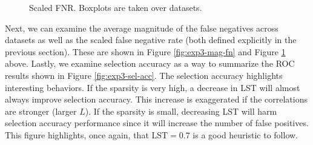 \documentclass[11pt]{article}
\begin{document}
\begin{figure}[H]
	\centering
	\caption{Scaled FNR. Boxplots are taken over datasets.}
	\label{fig:exp3-mag-fn-scaled}
\end{figure}

Next, we can examine the average magnitude of the false negatives across datasets as well as the scaled false negative rate (both defined explicitly in the previous section). These are shown in Figure \ref{fig:exp3-mag-fn} and Figure \ref{fig:exp3-mag-fn-scaled} above.  Lastly, we examine selection accuracy as a way to summarize the ROC results shown in Figure \ref{fig:exp3-sel-acc}. The selection accuracy highlights interesting behaviors. If the sparsity is very high, a decrease in LST will almost always improve selection accuracy. This increase is exaggerated if the correlations are stronger (larger $L$). If the sparsity is small, decreasing LST will harm selection accuracy performance since it will increase the number of false positives. This figure highlights, once again, that LST$=0.7$ is a good heuristic to follow.
\end{document}
